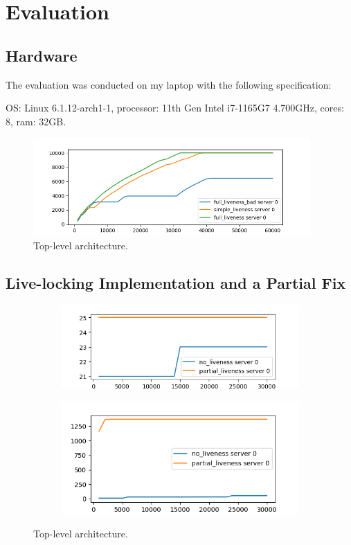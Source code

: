 \documentclass[11pt]{article}
\begin{document}
\section*{Evaluation}
\subsection*{Hardware}
The evaluation was conducted on my laptop with the following specification:

OS: Linux 6.1.12-arch1-1, processor: 11th Gen Intel i7-1165G7 4.700GHz, cores: 8, ram: 32GB.


\begin{figure}[H]
    \centering
    \includegraphics[width=400px]{liveness_simple_bad_config.png}
    \caption{Top-level architecture.}
    \vspace{-15pt}
\end{figure}


\subsection*{Live-locking Implementation and a Partial Fix}
\begin{figure}[H]
    \begin{subfigure}[b]{0.5\textwidth}
    \centering
    \includegraphics[width=\textwidth]{no_liveness_partial_liveness.png}
  \end{subfigure}%
    \begin{subfigure}[b]{0.5\textwidth}
    \centering
    \includegraphics[width=\textwidth]{medium.png}
    \end{subfigure}
    \centering
    \caption{Top-level architecture.}
    \vspace{-15pt}
\end{figure}
\end{document}
